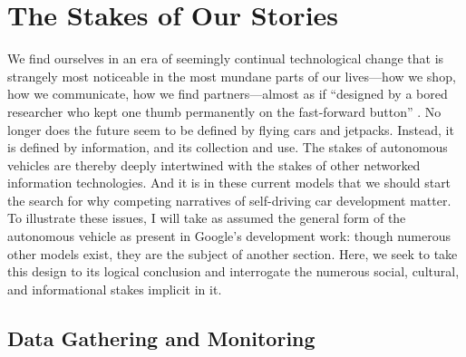 \chapter{The Stakes of Our Stories}
\label{chap:2}











We find ourselves in an era of seemingly continual technological
change that is strangely most noticeable in the most mundane parts of
our lives---how we shop, how we communicate, how we find
partners---almost as if ``designed by a bored researcher who kept one
thumb permanently on the fast-forward button'' \cite[p.
  7]{Neuromancer1984}. No longer does the future seem to be
defined by flying cars and jetpacks. Instead, it is defined by
information, and its collection and use. The stakes of autonomous
vehicles are thereby deeply intertwined with the
stakes of other networked information technologies. And it is in these
current models that we should start the search for why competing
narratives of self-driving car development matter. To illustrate these
issues, I will
take as assumed the general form of the autonomous vehicle as present
in Google's development work: though numerous other models exist, they
are the subject of another section. Here, we seek to take this design
to its logical conclusion and interrogate the numerous social,
cultural, and informational stakes implicit in it.


\section{Data Gathering and Monitoring} 

